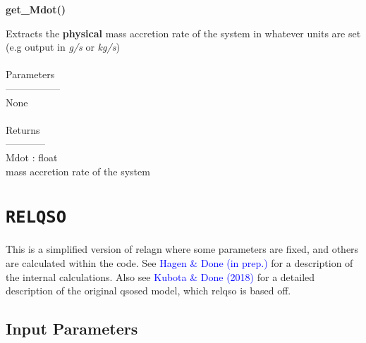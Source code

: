 \documentclass[a4paper, 11pt, times, onecolumn]{article}
\begin{document}
\vspace{1cm}

\noindent
{\bf get\_Mdot()}
\begin{adjustwidth}{1.5cm}{}

	\noindent
	Extracts the {\bf physical} mass accretion rate of the system in whatever units are set (e.g output in {\it g/s} or {\it kg/s}) 
	\\~\\
	Parameters\\
	-----------------\\
	\indent None
	\\~\\
	Returns \\
	------------\\ 
	\indent Mdot : float \\
	\indent {} mass accretion rate of the system

\end{adjustwidth}





\section{{\tt RELQSO}}

This is a simplified version of {\sc relagn} where some parameters are fixed, and others are calculated within the code. See \textcolor{blue}{Hagen \& Done (in prep.)} for a description of the internal calculations. Also see \textcolor{blue}{Kubota \& Done (2018)} for a detailed description of the original {\sc qsosed} model, which {\sc relqso} is based off.

\subsection{Input Parameters}
\end{document}
